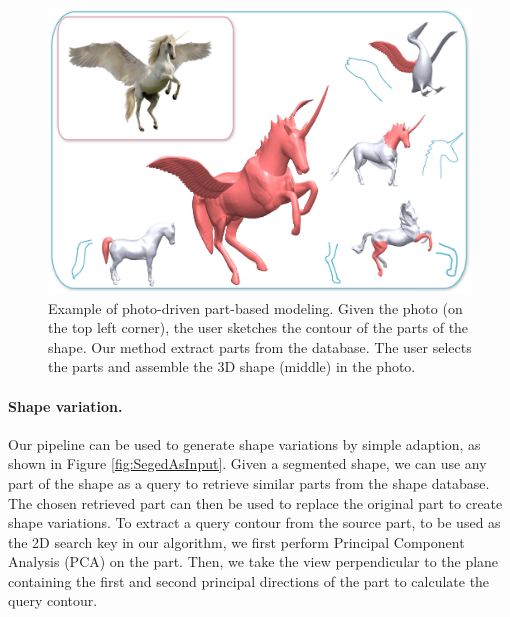 \begin{figure}\centering
\includegraphics[width=\linewidth]{./Material/PhotoDrivenModeling.pdf}
\caption{Example of photo-driven part-based modeling. Given the photo (on the top left corner), the user sketches the contour of the parts of the shape. Our method extract parts from the database. The user selects the parts and assemble the 3D shape (middle) in the photo.}\label{fig:PhotoModeling}
\end{figure}

\paragraph*{Shape variation.} Our pipeline can be used to generate shape variations by simple adaption, as shown in Figure \ref{fig:SegedAsInput}. Given a segmented shape, we can use any part of the shape as a query to retrieve similar parts from the shape database. The chosen retrieved part can then be used to replace the original part to create shape variations. To extract a query contour from the source part, to be used as the 2D search key in our algorithm, we first perform Principal Component Analysis (PCA) on the part. Then, we take the view perpendicular to the plane containing the first and second principal directions of the part to calculate the query contour.


